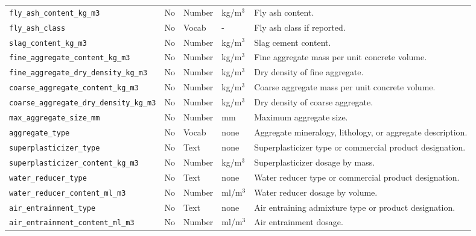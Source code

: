 \documentclass[11pt]{book}
\begin{document}
\begin{longtable}{p{}p{}p{}p{}p{}}
\texttt{fly\_ash\_content\_kg\_m3} & No & Number & kg/m$^3$ & Fly ash content. \\

\texttt{fly\_ash\_class} & No & Vocab & - & Fly ash class if reported. \\

\texttt{slag\_content\_kg\_m3} & No & Number & kg/m$^3$ & Slag cement content. \\

\texttt{fine\_aggregate\_content\_kg\_m3} & No & Number & kg/m$^3$ & Fine aggregate mass per unit concrete volume. \\

\texttt{fine\_aggregate\_dry\_density\_kg\_m3} & No & Number & kg/m$^3$ & Dry density of fine aggregate. \\

\texttt{coarse\_aggregate\_content\_kg\_m3} & No & Number & kg/m$^3$ & Coarse aggregate mass per unit concrete volume. \\

\texttt{coarse\_aggregate\_dry\_density\_kg\_m3} & No & Number & kg/m$^3$ & Dry density of coarse aggregate. \\

\texttt{max\_aggregate\_size\_mm} & No & Number & mm & Maximum aggregate size. \\

\texttt{aggregate\_type} & No & Vocab & none & Aggregate mineralogy, lithology, or aggregate description. \\

\texttt{superplasticizer\_type} & No & Text & none & Superplasticizer type or commercial product designation. \\

\texttt{superplasticizer\_content\_kg\_m3} & No & Number & kg/m$^3$ & Superplasticizer dosage by mass. \\

\texttt{water\_reducer\_type} & No & Text & none & Water reducer type or commercial product designation. \\

\texttt{water\_reducer\_content\_ml\_m3} & No & Number & ml/m$^3$ & Water reducer dosage by volume. \\

\texttt{air\_entrainment\_type} & No & Text & none & Air entraining admixture type or product designation. \\

\texttt{air\_entrainment\_content\_ml\_m3} & No & Number & ml/m$^3$ & Air entrainment dosage. \\


\end{longtable}
\end{document}
